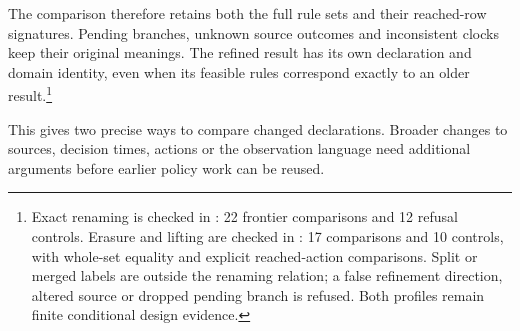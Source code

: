 The comparison therefore retains both the full rule sets and their reached-row signatures. Pending branches, unknown source outcomes and inconsistent clocks keep their original meanings. The refined result has its own declaration and domain identity, even when its feasible rules correspond exactly to an older result.\footnote{Exact renaming is checked in : 22 frontier comparisons and 12 refusal controls. Erasure and lifting are checked in : 17 comparisons and 10 controls, with whole-set equality and explicit reached-action comparisons. Split or merged labels are outside the renaming relation; a false refinement direction, altered source or dropped pending branch is refused. Both profiles remain finite conditional design evidence.}

This gives two precise ways to compare changed declarations. Broader changes to sources, decision times, actions or the observation language need additional arguments before earlier policy work can be reused.

